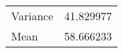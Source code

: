\begin{tabular}{lr}
\toprule
{} \\
\midrule
Variance &  41.829977 \\
Mean     &  58.666233 \\
\bottomrule
\end{tabular}
